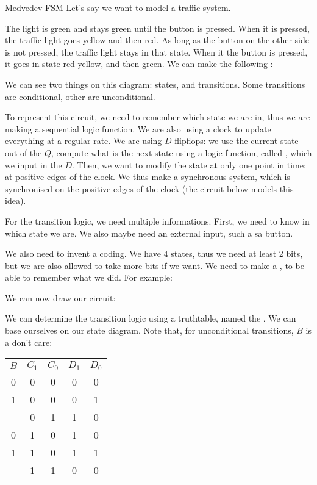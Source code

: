 \documentclass[a4paper]{article}
\begin{document}
\begin{parag}{Medvedev FSM}
    Let's say we want to model a traffic system.

    The light is green and stays green until the button is pressed. When it is pressed, the traffic light goes yellow and then red. As long as the button on the other side is not pressed, the traffic light stays in that state. When it the button is pressed, it goes in state red-yellow, and then green. We can make the following :

    We can see two things on this diagram: states, and transitions. Some transitions are conditional, other are unconditional.

    To represent this circuit, we need to remember which state we are in, thus we are making a sequential logic function. We are also using a clock to update everything at a regular rate. We are using $D$-flipflops: we use the current state out of the $Q$, compute what is the next state using a logic function, called , which we input in the $D$. Then, we want to modify the state at only one point in time: at positive edges of the clock. We thus make a synchronous system, which is synchronised on the positive edges of the clock (the circuit below models this idea).

    For the transition logic, we need multiple informations. First, we need to know in which state we are. We also maybe need an external input, such a sa button.

    We also need to invent a coding. We have 4 states, thus we need at least 2 bits, but we are also allowed to take more bits if we want. We need to make a , to be able to remember what we did. For example:
    
    We can now draw our circuit:

    We can determine the transition logic using a truthtable, named the . We can base ourselves on our state diagram. Note that, for unconditional transitions, $B$ is a don't care:
    \begin{center}
    \begin{tabular}{ccc|cc}
        $B$ & $C_1$ & $C_0$ & $D_1$ & $D_0$ \\
        \hline
        0 & 0 & 0 & 0 & 0 \\
        1 & 0 & 0 & 0 & 1 \\
        - & 0 & 1 & 1 & 0 \\
        0 & 1 & 0 & 1 & 0 \\
        1 & 1 & 0 & 1 & 1 \\
        - & 1 & 1 & 0 & 0 \\
    \end{tabular}
    \end{center}
    

\end{parag}
\end{document}
